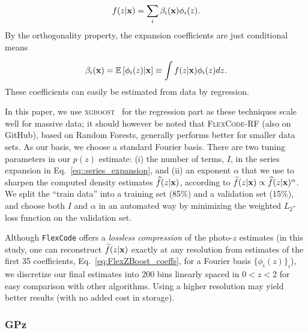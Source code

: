 \begin{equation}
f(z|{\mathbf{x}})=\sum_{i}\beta_{i }({\mathbf{x}})\phi_i(z). \label{eq::series_expansion}
\end{equation}
By the orthogonality property, the expansion coefficients are just conditional means

\begin{equation}
\beta_{i }({\mathbf{x}}) =  \mathbb{E}\left[\phi_i(z)|{\mathbf{x}}\right] \equiv \int f(z|{\mathbf{x}})   \phi_i(z) dz. \label{eq:FlexZBoost_coeffs}
\end{equation}
These coefficients can easily be estimated from data by regression.

In this paper, we use \textsc{xgboost}~\citep{Chen:16} for the regression part as these techniques scale well for massive data; it should however be noted that \textsc{FlexCode-RF} (also on GitHub), based on Random Forests, generally performs better for smaller data sets. As our basis, we choose a standard Fourier basis. There are two tuning parameters in our $p(z)$ estimate: (i) the number of terms, $I$, in the series expansion in Eq.~\ref{eq::series_expansion}, and (ii) an exponent $\alpha$ that we use to sharpen the computed density estimates $\widehat{f}(z|{\mathbf{x}})$, according to $\widetilde{f}(z|{\mathbf{x}}) \propto \widehat{f}(z|{\mathbf{x}})^\alpha$. We split the ``train data'' into a training set (85\%) and a validation set (15\%), and choose both $I$ and $\alpha$ in an automated way by minimizing the weighted $L_2$-loss function \citep[Eq. 5 in][]{Izbicki:17} on the  validation set.

Although {\tt FlexCode} offers a {\em lossless compression} of the photo-$z$ estimates (in this study, one can reconstruct $\widetilde{f}(z|{\mathbf{x}})$ exactly at any resolution from estimates of the first 35 coefficients, Eq.~\ref{eq:FlexZBoost_coeffs}, for a Fourier basis $\{\phi_i(z)\}_{i}$), we discretize our final estimates into 200 bins linearly spaced in $0 < z < 2$ for easy comparison with other algorithms. Using a higher resolution may yield better results (with no added cost in storage).




%
%

\subsubsection{GPz}
\label{sec:gpz}

